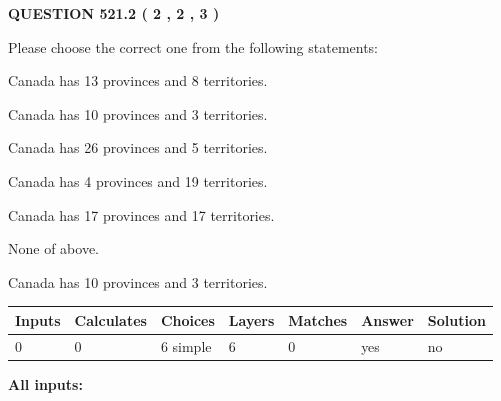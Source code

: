 \documentclass[12pt]{article}
\begin{document}
   
  
\vspace{0.2in}
  
{\textbf{\Large{QUESTION
521.2 
 ( 2 , 2 , 3 )
}}}
  
  
Please choose the correct one from the following statements:
 
 
Canada has  13 provinces and  8 territories.
 
 
Canada has 10  provinces and 3 territories.
 
 
Canada has  26 provinces and  5 territories.
 
 
Canada has   4 provinces and  19 territories.
 
 
Canada has  17 provinces and  17 territories.
 
 
 None of above.
 
 
\noindent{}
 
 
Canada has 10  provinces and 3 territories.
 
 
\noindent{}
 
 
   
   
   
   
\noindent\begin{tabular}{|l|l|l|l|l|l|l|}
 \hline
Inputs & Calculates & Choices & Layers & Matches & Answer & Solution \\ \hline
 0  & 
 0  & 
 6
  simple  
  & 
 6  & 
 0  & 
  yes & 
  no 
  \\ \hline
 \end{tabular}
   
   
   
   
\noindent{}
   
   
   
   
\noindent\vspace{0.1in}\hspace{-0.08in} {\textbf{\Large{All inputs: }}}
   
   
   
   
   
   
 \vspace{0.2in}
 
\end{document}
